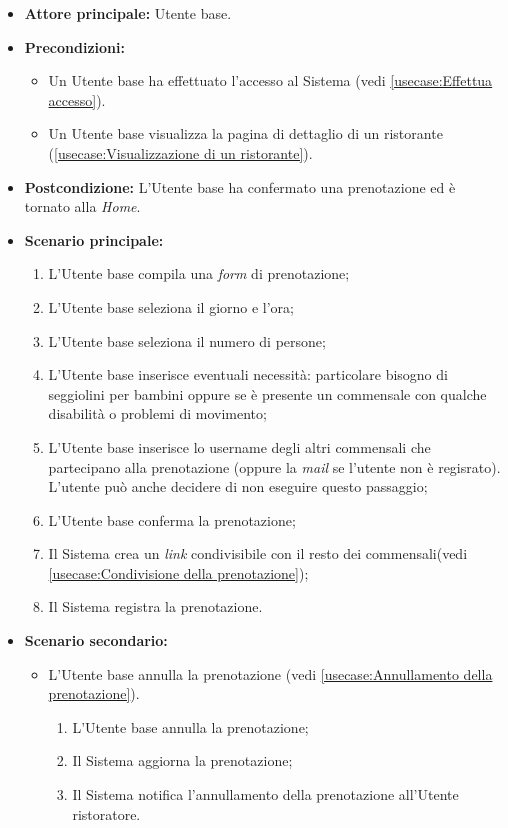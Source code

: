 \label{usecase:Prenotazione di un tavolo}
\begin{itemize}
	\item \textbf{Attore principale:} Utente base.
	\item \textbf{Precondizioni:}
		\begin{itemize}
			\item Un Utente base ha effettuato l'accesso al Sistema (vedi \autoref{usecase:Effettua accesso}).
			\item Un Utente base visualizza la pagina di dettaglio di un ristorante (\autoref{usecase:Visualizzazione di un ristorante}).
		\end{itemize}
	\item \textbf{Postcondizione:} L'Utente base ha confermato una prenotazione ed è tornato alla \textit{Home}.

	      
	\item \textbf{Scenario principale:}
	      \begin{enumerate}
		      \item L'Utente base compila una \textit{form} di prenotazione;
		      \item L'Utente base seleziona il giorno e l'ora;
		      \item L'Utente base seleziona il numero di persone;
		      \item L'Utente base inserisce eventuali necessità: particolare bisogno di seggiolini per bambini oppure se è presente un commensale con qualche disabilità o problemi di movimento;
		      \item L'Utente base inserisce lo username degli altri commensali che partecipano alla prenotazione (oppure la \textit{mail} se l'utente non è regisrato).
			  L'utente può anche decidere di non eseguire questo passaggio;
		      \item L'Utente base conferma la prenotazione;
		      \item Il Sistema crea un \textit{link} condivisibile con il resto dei commensali(vedi \autoref{usecase:Condivisione della prenotazione});
		      \item Il Sistema registra la prenotazione.

	      \end{enumerate}

	\item \textbf{Scenario secondario:}
	      \begin{itemize}
		      \item L'Utente base annulla la prenotazione (vedi
		            \autoref{usecase:Annullamento della prenotazione}).
		            \begin{enumerate}
			            \item L'Utente base annulla la prenotazione;
			            \item Il Sistema aggiorna la prenotazione;
			            \item Il Sistema notifica l'annullamento della prenotazione
			                  all'Utente ristoratore.
		            \end{enumerate}
	      \end{itemize}
\end{itemize}

